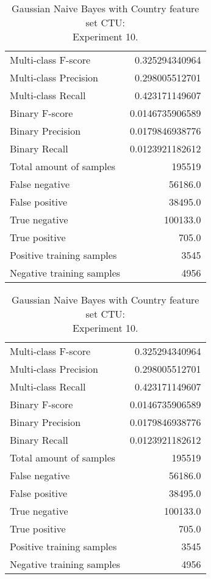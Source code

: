 \begin{table}[H]
\begin{minipage}{0.5\textwidth}
\caption{Gaussian Naive Bayes with Country feature set CTU: \\Experiment 9.}
\centering
\begin{tabular}{l r}
\toprule
Multi-class F-score & 0.325294340964 \\
Multi-class Precision & 0.298005512701 \\
Multi-class Recall & 0.423171149607 \\
\midrule
Binary F-score & 0.0146735906589 \\
Binary Precision & 0.0179846938776 \\
Binary Recall & 0.0123921182612 \\
\midrule
Total amount of samples & 195519 \\
False negative & 56186.0 \\
False positive & 38495.0 \\
True negative & 100133.0 \\
True positive & 705.0 \\
\midrule
Positive training samples & 3545 \\
Negative training samples & 4956 \\
\bottomrule
\end{tabular}
\end{minipage}
\hfillx
\begin{minipage}{0.5\textwidth}
\caption{Gaussian Naive Bayes with Country feature set CTU: \\Experiment 10.}
\centering
\begin{tabular}{l r}
\toprule
Multi-class F-score & 0.325294340964 \\
Multi-class Precision & 0.298005512701 \\
Multi-class Recall & 0.423171149607 \\
\midrule
Binary F-score & 0.0146735906589 \\
Binary Precision & 0.0179846938776 \\
Binary Recall & 0.0123921182612 \\
\midrule
Total amount of samples & 195519 \\
False negative & 56186.0 \\
False positive & 38495.0 \\
True negative & 100133.0 \\
True positive & 705.0 \\
\midrule
Positive training samples & 3545 \\
Negative training samples & 4956 \\
\bottomrule
\end{tabular}
\end{minipage}
\end{table}
